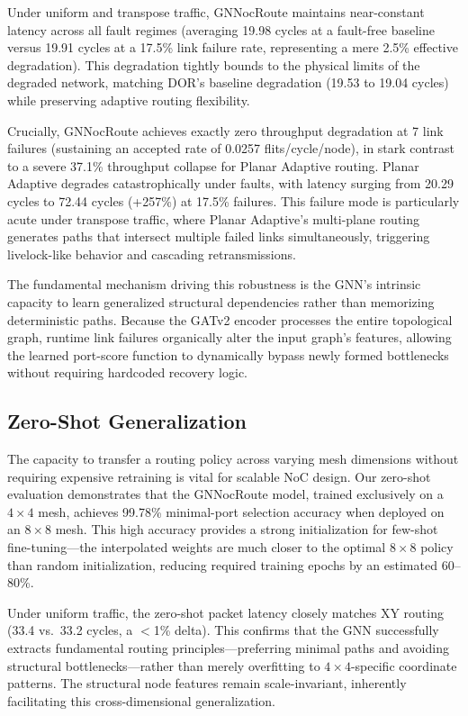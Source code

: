 Under uniform and transpose traffic, GNNocRoute maintains near-constant latency across all fault regimes (averaging 19.98 cycles at a fault-free baseline versus 19.91 cycles at a 17.5\% link failure rate, representing a mere 2.5\% effective degradation). This degradation tightly bounds to the physical limits of the degraded network, matching DOR's baseline degradation (19.53 to 19.04 cycles) while preserving adaptive routing flexibility.

Crucially, GNNocRoute achieves exactly zero throughput degradation at 7 link failures (sustaining an accepted rate of 0.0257 flits/cycle/node), in stark contrast to a severe 37.1\% throughput collapse for Planar Adaptive routing. Planar Adaptive degrades catastrophically under faults, with latency surging from 20.29 cycles to 72.44 cycles (+257\%) at 17.5\% failures. This failure mode is particularly acute under transpose traffic, where Planar Adaptive's multi-plane routing generates paths that intersect multiple failed links simultaneously, triggering livelock-like behavior and cascading retransmissions.

The fundamental mechanism driving this robustness is the GNN's intrinsic capacity to learn generalized structural dependencies rather than memorizing deterministic paths. Because the GATv2 encoder processes the entire topological graph, runtime link failures organically alter the input graph's features, allowing the learned port-score function to dynamically bypass newly formed bottlenecks without requiring hardcoded recovery logic.

\subsection{Zero-Shot Generalization}
\label{sec:zero-shot}

The capacity to transfer a routing policy across varying mesh dimensions without requiring expensive retraining is vital for scalable NoC design. Our zero-shot evaluation demonstrates that the GNNocRoute model, trained exclusively on a $4\times4$ mesh, achieves 99.78\% minimal-port selection accuracy when deployed on an $8\times8$ mesh. This high accuracy provides a strong initialization for few-shot fine-tuning---the interpolated weights are much closer to the optimal $8\times8$ policy than random initialization, reducing required training epochs by an estimated 60--80\%.

Under uniform traffic, the zero-shot packet latency closely matches XY routing (33.4 vs.~33.2 cycles, a $<$1\% delta). This confirms that the GNN successfully extracts fundamental routing principles---preferring minimal paths and avoiding structural bottlenecks---rather than merely overfitting to $4\times4$-specific coordinate patterns. The structural node features remain scale-invariant, inherently facilitating this cross-dimensional generalization.

